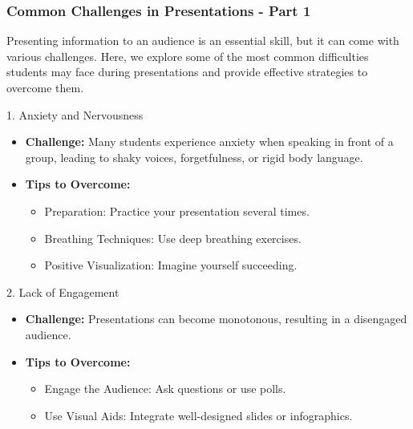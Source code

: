 \documentclass[aspectratio=169]{beamer}
\begin{document}
\begin{frame}[fragile]
    \frametitle{Common Challenges in Presentations - Part 1}
    Presenting information to an audience is an essential skill, but it can come with various challenges. Here, we explore some of the most common difficulties students may face during presentations and provide effective strategies to overcome them.
    
    \begin{block}{1. Anxiety and Nervousness}
        \begin{itemize}
            \item \textbf{Challenge:} Many students experience anxiety when speaking in front of a group, leading to shaky voices, forgetfulness, or rigid body language.
            \item \textbf{Tips to Overcome:}
                \begin{itemize}
                    \item Preparation: Practice your presentation several times.
                    \item Breathing Techniques: Use deep breathing exercises.
                    \item Positive Visualization: Imagine yourself succeeding.
                \end{itemize}
        \end{itemize}
    \end{block}
    
    \begin{block}{2. Lack of Engagement}
        \begin{itemize}
            \item \textbf{Challenge:} Presentations can become monotonous, resulting in a disengaged audience.
            \item \textbf{Tips to Overcome:}
                \begin{itemize}
                    \item Engage the Audience: Ask questions or use polls.
                    \item Use Visual Aids: Integrate well-designed slides or infographics.
                \end{itemize}
        \end{itemize}
    \end{block}
\end{frame}
\end{document}
